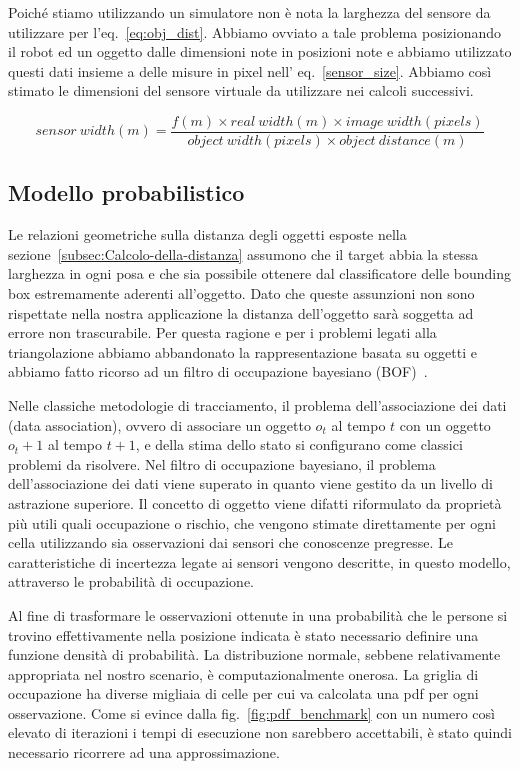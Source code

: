 \documentclass[a4paper]{article}
\begin{document}
	Poiché stiamo utilizzando un simulatore non è nota la larghezza del sensore
	da utilizzare per l'eq.~\ref{eq:obj_dist}. Abbiamo ovviato a tale problema
	posizionando il robot ed un oggetto dalle dimensioni note in posizioni note
	e abbiamo utilizzato questi dati insieme a delle misure in pixel nell'
	eq.~\ref{sensor_size}. Abbiamo così stimato le dimensioni del sensore
	virtuale da utilizzare nei calcoli successivi.

	\begin{equation}\label{sensor_size}
	sensor~width(m) = 
	\frac{f(m) \times real~width(m) \times image~width(pixels)}
	{object~width(pixels) \times object~distance(m)}
	\end{equation}
	
	\subsection{Modello probabilistico}\label{subsec:Modello-probabilistico}

	Le relazioni geometriche sulla distanza degli oggetti esposte nella
	sezione~\ref{subsec:Calcolo-della-distanza} assumono che il target abbia la
	stessa larghezza in ogni posa e che sia possibile ottenere dal
	classificatore delle bounding box estremamente aderenti all'oggetto. Dato che queste
	assunzioni non sono rispettate nella nostra applicazione la distanza
	dell'oggetto sarà soggetta ad errore non trascurabile. Per questa
	ragione e per i problemi legati alla triangolazione abbiamo abbandonato la
	rappresentazione basata su oggetti e abbiamo fatto ricorso ad un filtro di
	occupazione bayesiano (BOF)~\cite{tay2008bayesian}.

	Nelle classiche metodologie di tracciamento, il problema dell'associazione dei dati (data association), ovvero di associare un oggetto $o_t$ al tempo $t$ con un oggetto $o_t+1$ al tempo $t+1$, e della stima dello stato si configurano come classici problemi da risolvere. Nel filtro di occupazione bayesiano, il problema dell'associazione dei dati viene superato in quanto viene gestito da un livello di astrazione superiore. Il concetto di oggetto viene difatti riformulato da proprietà più utili quali occupazione o rischio, che vengono stimate direttamente per ogni cella utilizzando sia osservazioni dai sensori che conoscenze pregresse. Le caratteristiche di incertezza legate ai sensori vengono descritte, in questo modello, attraverso le probabilità di occupazione.

	Al fine di trasformare le osservazioni ottenute in una probabilità che le
	persone si trovino effettivamente nella posizione indicata è stato
	necessario definire una funzione densità di probabilità. La distribuzione
	normale, sebbene relativamente appropriata nel nostro scenario, è
	computazionalmente onerosa. La griglia di occupazione ha diverse migliaia
	di celle per cui va calcolata una pdf per ogni osservazione. Come si evince
	dalla fig.~\ref{fig:pdf_benchmark} con un numero così elevato di iterazioni
	i tempi di esecuzione non sarebbero accettabili, è stato quindi necessario
	ricorrere ad una approssimazione.
	
\end{document}
